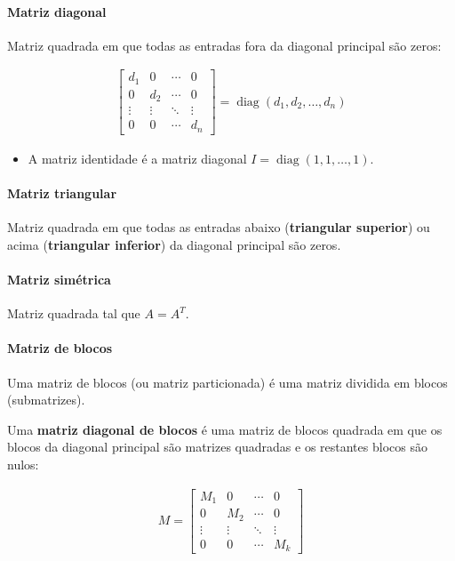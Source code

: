 \documentclass{article}
\begin{document}
\paragraph{Matriz diagonal}

Matriz quadrada em que todas as entradas fora da diagonal principal são zeros:

\begin{gather*}
\begin{bmatrix}
d_1 & 0 & \cdots & 0 \\
0 & d_2 & \cdots & 0 \\
\vdots & \vdots & \ddots & \vdots \\
0 & 0 & \cdots & d_n
\end{bmatrix}
= \operatorname{diag}(d_1, d_2, \ldots, d_n)
\end{gather*}

\begin{itemize}
    \item A matriz identidade é a matriz diagonal $I = \operatorname{diag}(1, 1, \ldots, 1)$.
\end{itemize}

\paragraph{Matriz triangular}

Matriz quadrada em que todas as entradas abaixo (\textbf{triangular superior}) ou acima
(\textbf{triangular inferior}) da diagonal principal são zeros.

\paragraph{Matriz simétrica}

Matriz quadrada tal que $A = A^T$.

\paragraph{Matriz de blocos}

Uma matriz de blocos (ou matriz particionada) é uma matriz dividida em blocos (submatrizes).

\smallskip

Uma \textbf{matriz diagonal de blocos} é uma matriz de blocos quadrada em que os blocos da diagonal principal
são matrizes quadradas e os restantes blocos são nulos:

\begin{gather*}
M =
\begin{bmatrix}
M_1 & 0 & \cdots & 0 \\
0 & M_2 & \cdots & 0 \\
\vdots & \vdots & \ddots & \vdots \\
0 & 0 & \cdots & M_k
\end{bmatrix}
\end{gather*}
\end{document}
